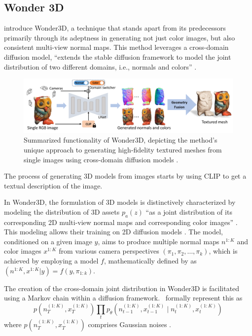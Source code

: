 \subsection{Wonder 3D}\label{Wonder3D}

\citeauthor{long2023wonder3d} introduce Wonder3D, a technique that stands apart  from its predecessors primarily through its adeptness in generating not just color images, but also consistent multi-view normal maps. This method leverages a cross-domain diffusion model, ``extends the stable diffusion framework to model the joint distribution of two different domains, i.e., normals and colors'' \citep{long2023wonder3d}.


\begin{figure}[ht]
  \centering
    \includegraphics[width=1\columnwidth]{figures/Wonder3D.png}
    \caption{Summarized functionality of Wonder3D, depicting the method's unique approach to generating high-fidelity textured meshes from single images using cross-domain diffusion models \citep{long2023wonder3d}.}\label{fig:Wonder3D}
\end{figure}

The process of generating 3D models from images starts by using CLIP \citep{radfordCLIP} to get a textual description of the image.  

In Wonder3D, the formulation of 3D models is distinctively characterized by modeling the distribution of 3D assets \(p_a{(z)}\) ``as a joint distribution of its corresponding 2D multi-view normal maps and corresponding color images'' \citep{long2023wonder3d}. This modeling allows their training on 2D diffusion models \citep{long2023wonder3d}. The model, conditioned on a given image \( y \), aims to produce multiple normal maps \( n^{1:K} \) and color images \( x^{1:K} \) from various camera perspectives \((\pi_1, \pi_2, \ldots, \pi_k)\), which is achieved by employing a model \( f \), mathematically defined by \citeauthor{long2023wonder3d} as \((n^{1:K}, x^{1:K} | y) = f(y, \pi_{1:k})\).

The creation of the cross-domain joint distribution in Wonder3D is facilitated using a Markov chain within a diffusion framework.~\citeauthor{long2023wonder3d} formally represent this as \[ p\left(n_T^{(1: K)}, x_T^{(1: K)}\right) \prod_t p_\theta\left(n_{t-1}^{(1: K)}, x_{t-1}^{(1: K)} \mid n_t^{(1: K)}, x_t^{(1: K)}\right) \] where \( p\left(n_T^{(1: K)}, x_T^{(1: K)}\right) \) comprises Gaussian noises \citep{long2023wonder3d}.

